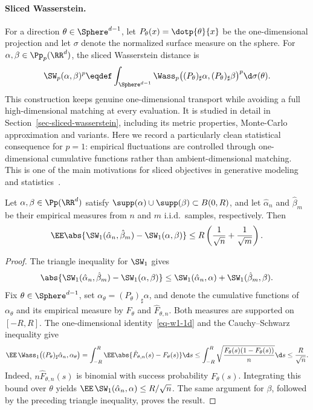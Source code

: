 \paragraph{Sliced Wasserstein.}
For a direction \(\theta\in\Sphere^{d-1}\), let \(P_\theta(x)=\dotp{\theta}{x}\) be the one-dimensional projection and let \(\sigma\) denote the normalized surface measure on the sphere. For \(\alpha,\beta\in\Pp_p(\RR^d)\), the sliced Wasserstein distance is
\[
	\SW_p(\alpha,\beta)^p
	\eqdef
	\int_{\Sphere^{d-1}}
	\Wass_p\big((P_\theta)_\sharp\alpha,(P_\theta)_\sharp\beta\big)^p
	\d\sigma(\theta).
\]
This construction keeps genuine one-dimensional transport while avoiding a full high-dimensional matching at every evaluation. It is studied in detail in Section~\ref{sec-sliced-wasserstein}, including its metric properties, Monte-Carlo approximation and variants. Here we record a particularly clean statistical consequence for \(p=1\): empirical fluctuations are controlled through one-dimensional cumulative functions rather than ambient-dimensional matching. This is one of the main motivations for sliced objectives in generative modeling and statistics~\cite{nadjahi2019asymptotic,nadjahi2020statistical,manole2019minimax}.
\begin{thm}\label{thm-sliced-sample-complexity}
	Let \(\alpha,\beta\in\Pp(\RR^d)\) satisfy
	\(\supp(\alpha)\cup\supp(\beta)\subset B(0,R)\), and let
	\(\hat\alpha_n\) and \(\hat\beta_m\) be their empirical measures from \(n\) and \(m\) i.i.d.\ samples, respectively. Then
	\[
		\EE\abs{\SW_1(\hat\alpha_n,\hat\beta_m)-\SW_1(\alpha,\beta)}
		\leq
		R\left(\frac{1}{\sqrt n}+\frac{1}{\sqrt m}\right).
	\]
\end{thm}

\begin{proof}
	The triangle inequality for \(\SW_1\) gives
	\[
		\abs{\SW_1(\hat\alpha_n,\hat\beta_m)-\SW_1(\alpha,\beta)}
		\leq
		\SW_1(\hat\alpha_n,\alpha)+\SW_1(\hat\beta_m,\beta).
	\]
	Fix \(\theta\in\Sphere^{d-1}\), set \(\alpha_\theta=(P_\theta)_\sharp\alpha\), and denote the cumulative functions of \(\alpha_\theta\) and its empirical measure by \(F_\theta\) and \(\hat F_{\theta,n}\). Both measures are supported on \([-R,R]\). The one-dimensional identity~\eqref{eq-w1-1d} and the Cauchy--Schwarz inequality give
	\[
		\EE\,\Wass_1\big((P_\theta)_\sharp\hat\alpha_n,\alpha_\theta\big)
		=
		\int_{-R}^R \EE\abs{\hat F_{\theta,n}(s)-F_\theta(s)}\d s
		\leq
		\int_{-R}^R \sqrt{\frac{F_\theta(s)(1-F_\theta(s))}{n}}\d s
		\leq
		\frac{R}{\sqrt n}.
	\]
	Indeed, \(n\hat F_{\theta,n}(s)\) is binomial with success probability \(F_\theta(s)\). Integrating this bound over \(\theta\) yields \(\EE\,\SW_1(\hat\alpha_n,\alpha)\leq R/\sqrt n\). The same argument for \(\beta\), followed by the preceding triangle inequality, proves the result.
\end{proof}

